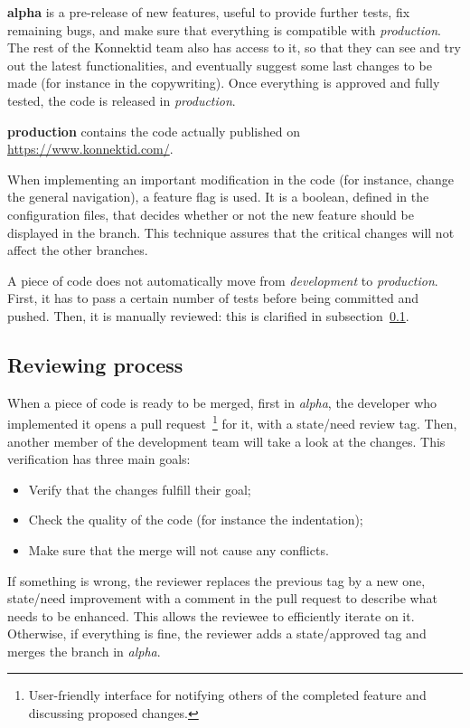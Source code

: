 \textbf{alpha} is a pre-release of new features, useful to provide further tests, fix remaining bugs, and make sure that everything is compatible with \textit{production}. The rest of the Konnektid team also has access to it, so that they can see and try out the latest functionalities, and eventually suggest some last changes to be made (for instance in the copywriting). Once everything is approved and fully tested, the code is released in \textit{production}.

\textbf{production} contains the code actually published on \url{https://www.konnektid.com/}.

When implementing an important modification in the code (for instance, change the general navigation), a \guillemotleft{} feature flag \guillemotright{} is used. It is a boolean, defined in the configuration files, that decides whether or not the new feature should be displayed in the branch. This technique assures that the critical changes will not affect the other branches.

A piece of code does not automatically move from \textit{development} to \textit{production}. First, it has to pass a certain number of tests before being committed and pushed. Then, it is manually reviewed: this is clarified in {\sc subsection}~\ref{ssec:reviewing}.

\subsection{Reviewing process}
\label{ssec:reviewing}

When a piece of code is ready to be merged, first in \textit{alpha}, the developer who implemented it opens a pull request~\footnote{User-friendly interface for notifying others of the completed feature and discussing proposed changes.} for it, with a \guillemotleft{} state/need review \guillemotright{} tag. Then, another member of the development team will take a look at the changes. This verification has three main goals:

\begin{itemize}[noitemsep]
	\item Verify that the changes fulfill their goal;
 	\item Check the quality of the code (for instance the indentation);
	\item Make sure that the merge will not cause any conflicts.
\end{itemize}

If something is wrong, the reviewer replaces the previous tag by a new one, \guillemotleft{} state/need improvement \guillemotright{} with a comment in the pull request to describe what needs to be enhanced. This allows the reviewee to efficiently iterate on it. Otherwise, if everything is fine, the reviewer adds a \guillemotleft{} state/approved \guillemotright{} tag and merges the branch in \textit{alpha}.

